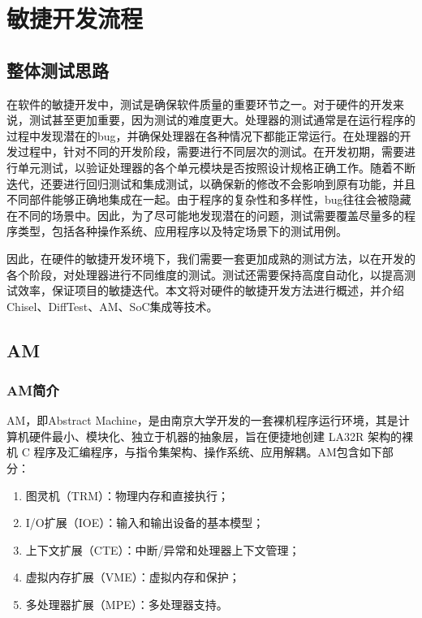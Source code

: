 
\chapter{敏捷开发流程}\label{chap:06-agility}

\section{整体测试思路}\label{sec:06-agility-001}

在软件的敏捷开发中，测试是确保软件质量的重要环节之一。对于硬件的开发来说，测试甚至更加重要，因为测试的难度更大。处理器的测试通常是在运行程序的过程中发现潜在的bug，并确保处理器在各种情况下都能正常运行。在处理器的开发过程中，针对不同的开发阶段，需要进行不同层次的测试。在开发初期，需要进行单元测试，以验证处理器的各个单元模块是否按照设计规格正确工作。随着不断迭代，还要进行回归测试和集成测试，以确保新的修改不会影响到原有功能，并且不同部件能够正确地集成在一起。由于程序的复杂性和多样性，bug往往会被隐藏在不同的场景中。因此，为了尽可能地发现潜在的问题，测试需要覆盖尽量多的程序类型，包括各种操作系统、应用程序以及特定场景下的测试用例。

因此，在硬件的敏捷开发环境下，我们需要一套更加成熟的测试方法，以在开发的各个阶段，对处理器进行不同维度的测试。测试还需要保持高度自动化，以提高测试效率，保证项目的敏捷迭代。本文将对硬件的敏捷开发方法进行概述，并介绍Chisel、DiffTest、AM、SoC集成等技术。

\section{AM}\label{sec:06-agility-002}

\subsection{AM简介}\label{sec:06-agility-003}

AM，即Abstract Machine，是由南京大学开发的一套裸机程序运行环境，其是计算机硬件最小、模块化、独立于机器的抽象层，旨在便捷地创建 LA32R 架构的裸机 C 程序及汇编程序，与指令集架构、操作系统、应用解耦。AM包含如下部分：

\begin{enumerate}
\def\labelenumi{\arabic{enumi}.}
\item
  图灵机（TRM）：物理内存和直接执行；
\item
  I/O扩展（IOE）：输入和输出设备的基本模型；
\item
  上下文扩展（CTE）：中断/异常和处理器上下文管理；
\item
  虚拟内存扩展（VME）：虚拟内存和保护；
\item
  多处理器扩展（MPE）：多处理器支持。
\end{enumerate}


